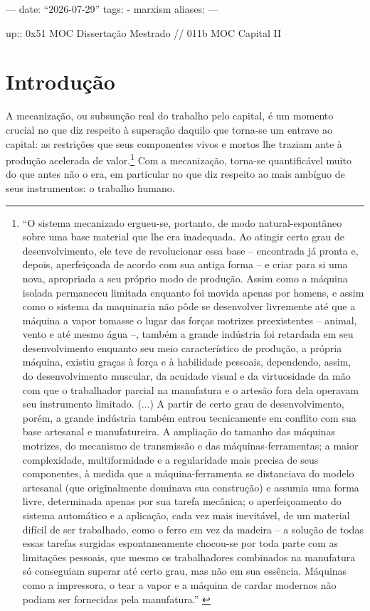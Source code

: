 ---
date: ``2026-07-29''
tags:
  - marxism
aliases:
---

up:: 0x51 MOC Dissertação Mestrado // 011b MOC Capital II

\section{Introdução}
A mecanização, ou subsunção real do trabalho pelo capital, é um momento crucial no que diz respeito à superação daquilo que torna-se um entrave ao capital: as restrições que seus componentes vivos e mortos lhe traziam ante à produção acelerada de valor.\footnote{``O sistema mecanizado ergueu-se, portanto, de modo natural-espontâneo sobre uma base material que lhe era inadequada. Ao atingir certo grau de desenvolvimento, ele teve de revolucionar essa base – encontrada já pronta e, depois, aperfeiçoada de acordo com sua antiga forma – e criar para si uma nova, apropriada a seu próprio modo de produção. Assim como a máquina isolada permaneceu limitada enquanto foi movida apenas por homens, e assim como o sistema da maquinaria não pôde se desenvolver livremente até que a máquina a vapor tomasse o lugar das forças motrizes preexistentes – animal, vento e até mesmo água –, também a grande indústria foi retardada em seu desenvolvimento enquanto seu meio característico de produção, a própria máquina, existiu graças à força e à habilidade pessoais, dependendo, assim, do desenvolvimento muscular, da acuidade visual e da virtuosidade da mão com que o trabalhador parcial na manufatura e o artesão fora dela operavam seu instrumento limitado. (...) A partir de certo grau de desenvolvimento, porém, a grande indústria também entrou tecnicamente em conflito com sua base artesanal e manufatureira. A ampliação do tamanho das máquinas motrizes, do mecanismo de transmissão e das máquinas-ferramentas; a maior complexidade, multiformidade e a regularidade mais precisa de seus componentes, à medida que a máquina-ferramenta se distanciava do modelo artesanal (que originalmente dominava sua construção) e assumia uma forma livre, determinada apenas por sua tarefa mecânica; o aperfeiçoamento do sistema automático e a aplicação, cada vez mais inevitável, de um material difícil de ser trabalhado, como o ferro em vez da madeira – a solução de todas essas tarefas surgidas espontaneamente chocou-se por toda parte com as limitações pessoais, que mesmo os trabalhadores combinados na manufatura só conseguiam superar até certo grau, mas não em sua essência. Máquinas como a impressora, o tear a vapor e a máquina de cardar modernos não podiam ser fornecidas pela manufatura.'' \parencite[p. 456-7]{Marx2017}} Com a mecanização, torna-se quantificável muito do que antes não o era, em particular no que diz respeito ao mais ambíguo de seus instrumentos: o trabalho humano. 


